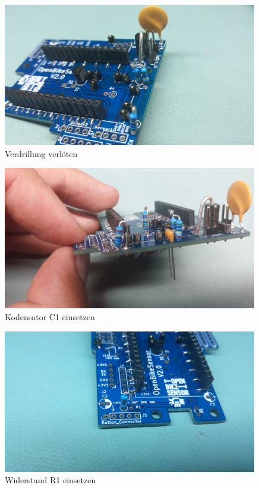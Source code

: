 \documentclass[12pt, a4paper]{article}		%
\begin{document}
\begin{figure}[H]
	\centering
		\includegraphics[width=0.99\textwidth]{Grafiken/20200726_180808.jpg}
	\caption{Verdrillung verlöten}
	\label{fig:20200726_180808}
\end{figure}

\begin{figure}[H]
	\centering
		\includegraphics[width=0.99\textwidth]{Grafiken/20200726_181136.jpg}
	\caption{Kodensator C1 einsetzen}
	\label{fig:20200726_181136}
\end{figure}

\begin{figure}[H]
	\centering
		\includegraphics[width=0.99\textwidth]{Grafiken/20200726_181412.jpg}
	\caption{Widerstand R1 einsetzen}
	\label{fig:20200726_181412}
\end{figure}
\end{document}
